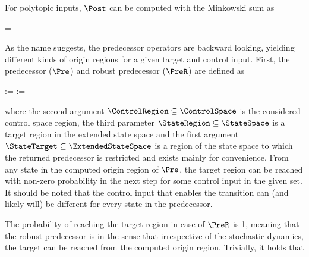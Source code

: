     For polytopic inputs, $\Post$ can be computed with the Minkowski sum as

    \startformula
         = \MatA \StateRegion \oplus \MatB \ControlRegion \oplus \RandomSpace \EndPeriod
    \stopformula

\stopsection


\startsubsection[title={Predecessors}]

    As the name suggests, the predecessor operators are backward looking, yielding different kinds of origin regions for a given target and control input.
    First, the predecessor ($\Pre$) and robust predecessor ($\PreR$) are defined as

    \startformula
        \startalign[n=2,align={right,left}]
            \NC {} :=
            \NC {} \EndAnd
            \NR
            \NC {} :=
            \NC {} \EndComma
            \NR
        \stopalign
    \stopformula

    where the second argument $\ControlRegion \subseteq \ControlSpace$ is the considered control space region, the third parameter $\StateRegion \subseteq \StateSpace$ is a target region in the extended state space and the first argument $\StateTarget \subseteq \ExtendedStateSpace$ is a region of the state space to which the returned predecessor is restricted and exists mainly for convenience.
    From any state in the computed origin region of $\Pre$, the target region can be reached with non-zero probability in the next step for some control input in the given set.
    It should be noted that the control input that enables the transition can (and likely will) be different for every state in the predecessor.

    The probability of reaching the target region in case of $\PreR$ is 1, meaning that the robust predecessor is  in the sense that irrespective of the stochastic dynamics, the target can be reached from the computed origin region.
    Trivially, it holds that

    \startformula
         \subseteq {} \EndPeriod
    \stopformula

